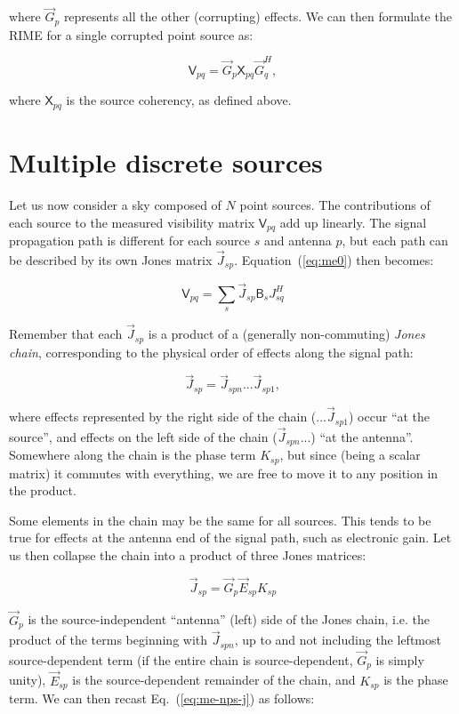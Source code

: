 \documentclass[referee]{aa}
\newcommand{\herm}{H}
\newcommand{\jones}[2]{\vec {#1}_{#2}}
\newcommand{\jonesT}[2]{\vec {#1}^{\herm}_{#2}}
\newcommand{\coh}[2]{\mathsf{{#1}}_{{#2}}}
\begin{document}
where $\jones{G}{p}$ represents all the other (corrupting) effects. We can then formulate the RIME for a single corrupted point source as:

  \begin{equation}\label{eq:me-point-source-corrupted}
  \coh{V}{pq} = \jones{G}{p} \coh{X}{pq} \jonesT{G}{q},
  \end{equation}

where $\coh{X}{pq}$ is the source coherency, as defined above.
 

\section{Multiple discrete sources\label{sec:me-multiple-sources}}

Let us now consider a sky composed of $N$ point sources. The contributions of each source to the measured visibility matrix $\coh{V}{pq}$ add up linearly. The signal propagation path is different for each source $s$ and antenna $p$, but each path can be described by its own Jones matrix $\jones{J}{sp}$. Equation~(\ref{eq:me0}) then becomes:

  \begin{equation}\label{eq:me-nps-j}
  \coh{V}{pq} = \sum_{s}{\jones{J}{sp} \coh{B}{s} J^\herm_{sq}}
  \end{equation}

Remember that each $\jones{J}{sp}$ is a product of a (generally non-commuting) {\em Jones chain}, corresponding to the physical order of effects along the signal path:

  \[
  \jones{J}{sp} = \jones{J}{spn} ... \jones{J}{sp1},
  \]

where effects represented by the right side of the chain ($...\jones{J}{sp1}$) occur ``at the source'', and effects on the left side of the chain ($\jones{J}{spn}...$) ``at the antenna''. Somewhere along the chain is the phase term $K_{sp}$, but since (being a scalar matrix) it commutes with everything, we are free to move it to any position in the product.

Some elements in the chain may be the same for all sources. This tends to be true for effects at the antenna end of the signal path, such as electronic gain. Let us then collapse the chain into a product of three Jones matrices:

  \[
  \jones{J}{sp} = \jones{G}{p} \jones{E}{sp} K_{sp}
  \]

$\jones{G}{p}$ is the source-independent ``antenna'' (left) side of the Jones chain, i.e. the product of the terms beginning with $\jones{J}{spn}$, up to and not including the leftmost source-dependent term (if the entire chain is source-dependent, $\jones{G}{p}$ is simply unity), $\jones{E}{sp}$ is the source-dependent remainder of the chain, and $K_{sp}$ is the phase term. We can then recast Eq.~(\ref{eq:me-nps-j}) as follows:
\end{document}
